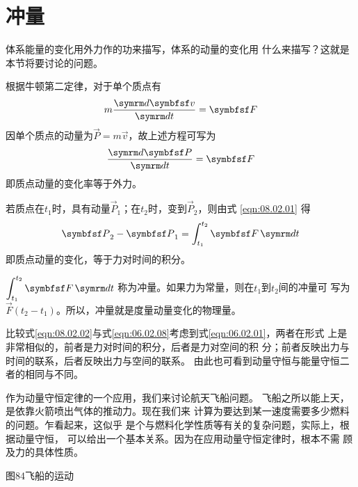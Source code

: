 \section[冲量]{冲\qquad 量}\label{sec:08.02}

体系能量的变化用外力作的功来描写，体系的动量的变化用
什么来描写？这就是本节将要讨论的问题。

根据牛顿第二定律，对于单个质点有
\begin{equation*}
    m \frac { \dif \vec{v} } { \dif t } = \vec{F}
\end{equation*}
因单个质点的动量为$  \vec{P} = m \vec{v}   $，故上述方程可写为
\begin{equation}\label{eqn:08.02.01}
    \frac { \dif \vec{P} } { \dif t } = \vec{F}
\end{equation}
即质点动量的变化率等于外力。

若质点在$  t _ { 1 }   $时，具有动量$\vec{P} _ 1$；在$ t _ { 2 } $时，变到$\vec{P} _ 2$，则由式 \eqref{eqn:08.02.01}
得
\begin{equation}\label{eqn:08.02.02}
    \vec{P} _ { 2 } - \vec{P} _ { 1 } = \int _ { t _ { 1 } } ^ { t _ { 2 } } \vec{F} \dif t
\end{equation}
即质点动量的变化，等于力对时间的积分。

$ \displaystyle \int _ { t _ { 1 } } ^ { t _ { 2 } } \vec{F} \dif t $
称为冲量。如果力为常量，则在$ t_1 $到$ t_2 $间的冲量可
写为$  \vec{F} \left( t _ { 2 } - t _ { 1 } \right) $。所以，冲量就是度量动量变化的物理量。

比较式\eqref{eqn:08.02.02}与式\eqref{eqn:06.02.08}\lhbrak 考虑到式\eqref{eqn:06.02.01}\rhbrak ，两者在形式
上是非常相似的，前者是力对时间的积分，后者是力对空间的积
分；前者反映出力与时间的联系，后者反映出力与空间的联系。
由此也可看到动量守恒与能量守恒二者的相同与不同。

作为动量守恒定律的一个应用，我们来讨论航天飞船问题。
飞船之所以能上天，是依靠火箭喷出气体的推动力。现在我们来
计算为要达到某一速度需要多少燃料的问题。乍看起来，这似乎
是个与燃料化学性质等有关的复杂问题，实际上，根据动量守恒，
可以给出一个基本关系。因为在应用动量守恒定律时，根本不需
顾及力的具体性质。

图84飞船的运动

